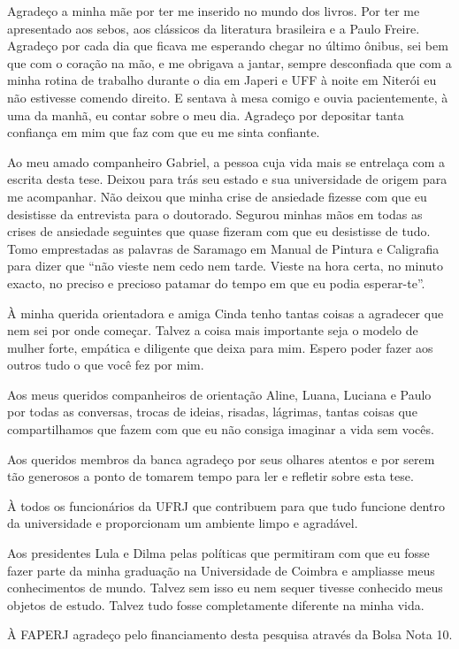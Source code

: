 \documentclass[
	12pt,				%
	oneside,
	a4paper,			%
	english,			%
	spanish,			%
	brazil				%
	]{abntex2}
\begin{document}

\begin{agradecimentos}
Agradeço a minha mãe por ter me inserido no mundo dos livros. Por ter me apresentado aos sebos, aos clássicos da literatura brasileira e a Paulo Freire. Agradeço por cada dia que ficava me esperando chegar no último ônibus, sei bem que com o coração na mão, e me obrigava a jantar, sempre desconfiada que com a minha rotina de trabalho durante o dia em Japeri e UFF à noite em Niterói eu não estivesse comendo direito. E sentava à mesa comigo e ouvia pacientemente, à uma da manhã, eu contar sobre o meu dia. Agradeço por depositar tanta confiança em mim que faz com que eu me sinta confiante.

Ao meu amado companheiro Gabriel, a pessoa cuja vida mais se entrelaça com a escrita desta tese. Deixou para trás seu estado e sua universidade de origem para me acompanhar. Não deixou que minha crise de ansiedade fizesse com que eu desistisse da entrevista para o doutorado. Segurou minhas mãos em todas as crises de ansiedade seguintes que quase fizeram com que eu desistisse de tudo. Tomo emprestadas as palavras de Saramago em Manual de Pintura e Caligrafia para dizer que “não vieste nem cedo nem tarde. Vieste na hora certa, no minuto exacto, no preciso e precioso patamar do tempo em que eu podia esperar-te”.

À minha querida orientadora e amiga Cinda tenho tantas coisas a agradecer que nem sei por onde começar. Talvez a coisa mais importante seja o modelo de mulher forte, empática e diligente que deixa para mim. Espero poder fazer aos outros tudo o que você fez por mim.

Aos meus queridos companheiros de orientação Aline, Luana, Luciana e Paulo por todas as conversas, trocas de ideias, risadas, lágrimas, tantas coisas que compartilhamos que fazem com que eu não consiga imaginar a vida sem vocês.

Aos queridos membros da banca agradeço por seus olhares atentos e por serem tão generosos a ponto de tomarem tempo para ler e refletir sobre esta tese. 

À todos os funcionários da UFRJ que contribuem para que tudo funcione dentro da universidade e proporcionam um ambiente limpo e agradável.

Aos presidentes Lula e Dilma pelas políticas que permitiram com que eu fosse fazer parte da minha graduação na Universidade de Coimbra e ampliasse meus conhecimentos de mundo. Talvez sem isso eu nem sequer tivesse conhecido meus objetos de estudo. Talvez tudo fosse completamente diferente na minha vida.

À FAPERJ agradeço pelo financiamento desta pesquisa através da Bolsa Nota 10.

\end{agradecimentos}
\end{document}
